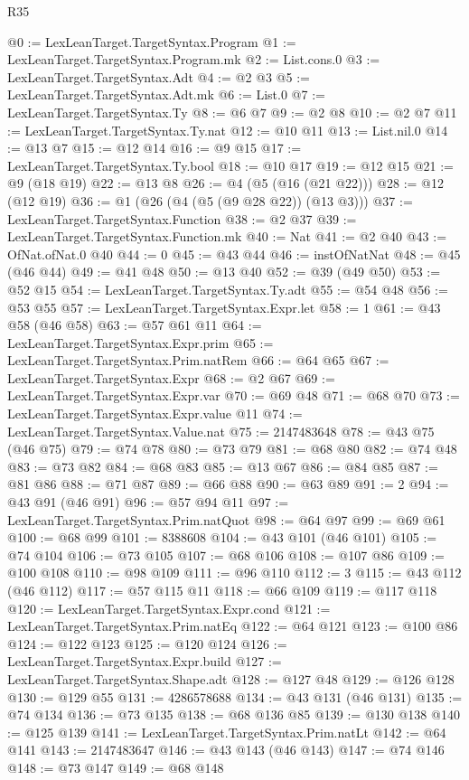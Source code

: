 \begin{lexlean}{R35}
\begin{coremodule}
@0 := LexLeanTarget.TargetSyntax.Program
@1 := LexLeanTarget.TargetSyntax.Program.mk
@2 := List.cons.{0}
@3 := LexLeanTarget.TargetSyntax.Adt
@4 := @2 @3
@5 := LexLeanTarget.TargetSyntax.Adt.mk
@6 := List.{0}
@7 := LexLeanTarget.TargetSyntax.Ty
@8 := @6 @7
@9 := @2 @8
@10 := @2 @7
@11 := LexLeanTarget.TargetSyntax.Ty.nat
@12 := @10 @11
@13 := List.nil.{0}
@14 := @13 @7
@15 := @12 @14
@16 := @9 @15
@17 := LexLeanTarget.TargetSyntax.Ty.bool
@18 := @10 @17
@19 := @12 @15
@21 := @9 (@18 @19)
@22 := @13 @8
@26 := @4 (@5 (@16 (@21 @22)))
@28 := @12 (@12 @19)
@36 := @1 (@26 (@4 (@5 (@9 @28 @22)) (@13 @3)))
@37 := LexLeanTarget.TargetSyntax.Function
@38 := @2 @37
@39 := LexLeanTarget.TargetSyntax.Function.mk
@40 := Nat
@41 := @2 @40
@43 := OfNat.ofNat.{0} @40
@44 := 0
@45 := @43 @44
@46 := instOfNatNat
@48 := @45 (@46 @44)
@49 := @41 @48
@50 := @13 @40
@52 := @39 (@49 @50)
@53 := @52 @15
@54 := LexLeanTarget.TargetSyntax.Ty.adt
@55 := @54 @48
@56 := @53 @55
@57 := LexLeanTarget.TargetSyntax.Expr.let
@58 := 1
@61 := @43 @58 (@46 @58)
@63 := @57 @61 @11
@64 := LexLeanTarget.TargetSyntax.Expr.prim
@65 := LexLeanTarget.TargetSyntax.Prim.natRem
@66 := @64 @65
@67 := LexLeanTarget.TargetSyntax.Expr
@68 := @2 @67
@69 := LexLeanTarget.TargetSyntax.Expr.var
@70 := @69 @48
@71 := @68 @70
@73 := LexLeanTarget.TargetSyntax.Expr.value @11
@74 := LexLeanTarget.TargetSyntax.Value.nat
@75 := 2147483648
@78 := @43 @75 (@46 @75)
@79 := @74 @78
@80 := @73 @79
@81 := @68 @80
@82 := @74 @48
@83 := @73 @82
@84 := @68 @83
@85 := @13 @67
@86 := @84 @85
@87 := @81 @86
@88 := @71 @87
@89 := @66 @88
@90 := @63 @89
@91 := 2
@94 := @43 @91 (@46 @91)
@96 := @57 @94 @11
@97 := LexLeanTarget.TargetSyntax.Prim.natQuot
@98 := @64 @97
@99 := @69 @61
@100 := @68 @99
@101 := 8388608
@104 := @43 @101 (@46 @101)
@105 := @74 @104
@106 := @73 @105
@107 := @68 @106
@108 := @107 @86
@109 := @100 @108
@110 := @98 @109
@111 := @96 @110
@112 := 3
@115 := @43 @112 (@46 @112)
@117 := @57 @115 @11
@118 := @66 @109
@119 := @117 @118
@120 := LexLeanTarget.TargetSyntax.Expr.cond
@121 := LexLeanTarget.TargetSyntax.Prim.natEq
@122 := @64 @121
@123 := @100 @86
@124 := @122 @123
@125 := @120 @124
@126 := LexLeanTarget.TargetSyntax.Expr.build
@127 := LexLeanTarget.TargetSyntax.Shape.adt
@128 := @127 @48
@129 := @126 @128
@130 := @129 @55
@131 := 4286578688
@134 := @43 @131 (@46 @131)
@135 := @74 @134
@136 := @73 @135
@138 := @68 @136 @85
@139 := @130 @138
@140 := @125 @139
@141 := LexLeanTarget.TargetSyntax.Prim.natLt
@142 := @64 @141
@143 := 2147483647
@146 := @43 @143 (@46 @143)
@147 := @74 @146
@148 := @73 @147
@149 := @68 @148

\end{coremodule}
\end{lexlean}
